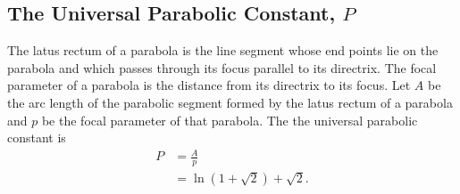 \documentclass[12pt]{article}
\begin{document}
\subsection{The Universal Parabolic Constant, $P$}
The latus rectum of a parabola is the line segment whose end points lie on the parabola and which passes through its focus parallel to its directrix. The focal parameter of a parabola is the distance from its directrix to its focus. Let $A$ be the arc length of the parabolic segment formed by the latus rectum of a parabola and $p$ be the focal parameter of that parabola. The the universal parabolic constant is
\begin{align*}
P &= \frac{A}{p}\\
&= \ln(1 + \sqrt{2}) + \sqrt{2}.
\end{align*}

\pagebreak
\end{document}
